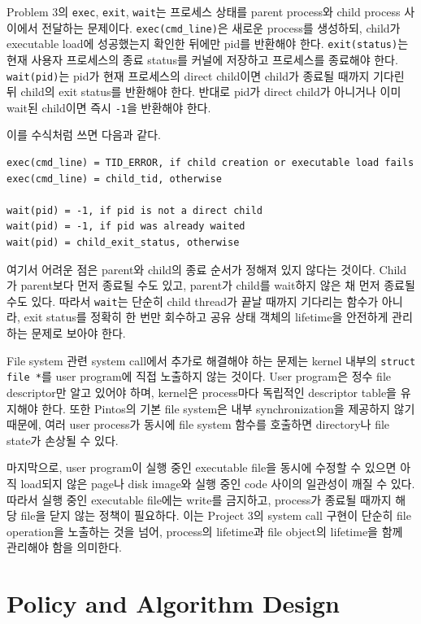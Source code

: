 \documentclass[conference]{IEEEtran}
\newcommand{\codefont}[1]{\texttt{\color{darkmagenta}#1}}
\begin{document}
Problem 3의 \codefont{exec}, \codefont{exit}, \codefont{wait}는 프로세스 상태를 parent process와 child process 사이에서 전달하는 문제이다. \codefont{exec(cmd\_line)}은 새로운 process를 생성하되, child가 executable load에 성공했는지 확인한 뒤에만 pid를 반환해야 한다. \codefont{exit(status)}는 현재 사용자 프로세스의 종료 status를 커널에 저장하고 프로세스를 종료해야 한다. \codefont{wait(pid)}는 pid가 현재 프로세스의 direct child이면 child가 종료될 때까지 기다린 뒤 child의 exit status를 반환해야 한다. 반대로 pid가 direct child가 아니거나 이미 wait된 child이면 즉시 \codefont{-1}을 반환해야 한다.

이를 수식처럼 쓰면 다음과 같다.

\begin{lstlisting}[numbers=none]
exec(cmd_line) = TID_ERROR, if child creation or executable load fails
exec(cmd_line) = child_tid, otherwise

wait(pid) = -1, if pid is not a direct child
wait(pid) = -1, if pid was already waited
wait(pid) = child_exit_status, otherwise
\end{lstlisting}

여기서 어려운 점은 parent와 child의 종료 순서가 정해져 있지 않다는 것이다. Child가 parent보다 먼저 종료될 수도 있고, parent가 child를 wait하지 않은 채 먼저 종료될 수도 있다. 따라서 \codefont{wait}는 단순히 child thread가 끝날 때까지 기다리는 함수가 아니라, exit status를 정확히 한 번만 회수하고 공유 상태 객체의 lifetime을 안전하게 관리하는 문제로 보아야 한다.

File system 관련 system call에서 추가로 해결해야 하는 문제는 kernel 내부의 \codefont{struct file *}를 user program에 직접 노출하지 않는 것이다. User program은 정수 file descriptor만 알고 있어야 하며, kernel은 process마다 독립적인 descriptor table을 유지해야 한다. 또한 Pintos의 기본 file system은 내부 synchronization을 제공하지 않기 때문에, 여러 user process가 동시에 file system 함수를 호출하면 directory나 file state가 손상될 수 있다.

마지막으로, user program이 실행 중인 executable file을 동시에 수정할 수 있으면 아직 load되지 않은 page나 disk image와 실행 중인 code 사이의 일관성이 깨질 수 있다. 따라서 실행 중인 executable file에는 write를 금지하고, process가 종료될 때까지 해당 file을 닫지 않는 정책이 필요하다. 이는 Project 3의 system call 구현이 단순히 file operation을 노출하는 것을 넘어, process의 lifetime과 file object의 lifetime을 함께 관리해야 함을 의미한다.

\section{Policy and Algorithm Design}
\end{document}
